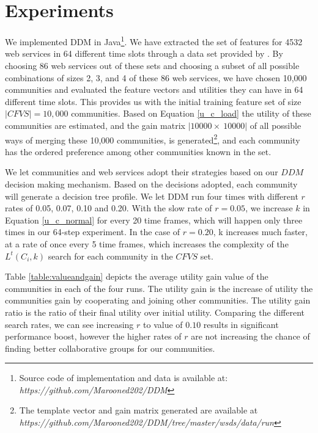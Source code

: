 \section{Experiments}\label{s:experiments}
We implemented DDM in Java\footnote{Source code of implementation and data is available at: \emph{https://github.com/Marooned202/DDM}}. We have extracted the set of features for 4532 web services in 64 different time slots through a data set provided by \cite{10.1109/ISSRE.2011.17}. By choosing 86 web services out of these sets and choosing a subset of all possible combinations of sizes 2, 3, and 4 of these 86 web services, we have chosen 10,000 communities and evaluated the feature vectors and utilities they can have in 64 different time slots. This provides us with the initial training feature set of size $|CFVS| = 10,000$ communities. Based on Equation \ref{u_c_load} the utility of these communities are estimated, and the gain matrix $|10000 \times~ 10000|$ of all possible ways of merging these 10,000 communities, is generated\footnote {The template vector and gain matrix generated are available at \emph{https://github.com/Marooned202/DDM/tree/master/wsds/data/run}}, and each community has the ordered preference among other communities known in the set.

We let communities and web services adopt their strategies based on our $DDM$ decision making mechanism. Based on the decisions adopted, each community will generate a decision tree profile. We let DDM run four times with different $r$ rates of 0.05, 0.07, 0.10 and 0.20. With the slow rate of $r = 0.05$, we increase $k$ in Equation \ref{u_c_normal} for every 20 time frames, which will happen only three times in our 64-step experiment. In the case of $r = 0.20$, k increases much faster, at a rate of once every 5 time frames, which increases the complexity of the $L^t(C_i,k)$ search for each community in the $CFVS$ set.

Table \ref{table:valueandgain} depicts the average utility gain value of the communities in each of the four runs. The utility gain is the increase of utility the communities gain by cooperating and joining other communities. The utility gain ratio is the ratio of their final utility over initial utility. Comparing the different search rates, we can see increasing $r$ to value of $0.10$ results in significant performance boost, however the higher rates of $r$ are not increasing the chance of finding better collaborative groups for our communities.

